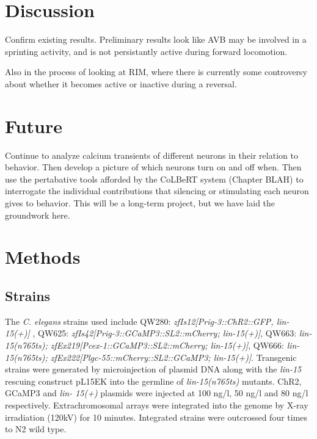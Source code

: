 \section{Discussion}


Confirm existing results. Preliminary results look like AVB may be involved in a sprinting activity, and is not persistantly active during forward locomotion. 

Also in the process of looking at RIM, where there is currently some controversy about whether it becomes active or inactive during a reversal.

\section{Future}
Continue to analyze calcium transients of different neurons in their relation to behavior. Then develop a picture of which neurons turn on and off when. Then use the pertabative tools afforded by the CoLBeRT system (Chapter BLAH) to interrogate the individual contributions that silencing or stimulating each neuron gives to behavior. This will be a long-term project, but we have laid the groundwork here. 

\section{Methods}

\subsection{Strains}
The \textit{C. elegans} strains used include QW280: \textit{zfIs12[Prig-3::ChR2::GFP, lin-15(+)]}
, QW625: \textit{zfIs42[Prig-3::GCaMP3::SL2::mCherry; lin-15(+)]}, QW663: \textit{lin-15(n765ts); zfEx219[Pcex-1::GCaMP3::SL2::mCherry; lin-15(+)]}, QW666: \textit{lin-15(n765ts);
zfEx222[Plgc-55::mCherry::SL2::GCaMP3; lin-15(+)]}. Transgenic strains were
generated by microinjection of plasmid DNA along with the \textit{lin-15} rescuing construct
pL15EK into the germline of \textit{lin-15(n765ts)} mutants. ChR2, GCaMP3 and \textit{lin-
15(+)} plasmids were injected at 100 ng/\textmu l, 50 ng/\textmu l and 80 ng/\textmu l respectively.
Extrachromosomal arrays were integrated into the genome by X-ray irradiation (120kV)
for 10 minutes. Integrated strains were outcrossed four times to N2 wild type.

